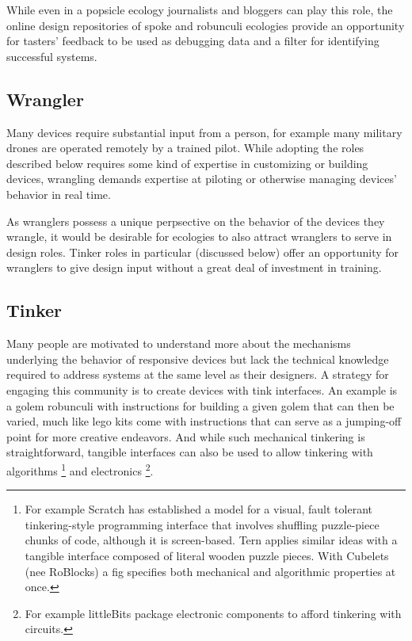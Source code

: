 While even in a popsicle ecology journalists and bloggers can play this role, the online design repositories of spoke and robunculi ecologies provide an opportunity for tasters' feedback to be used as debugging data and a filter for identifying successful systems. 

\subsection{Wrangler}
Many devices require substantial input from a person, for example many military drones are operated remotely by a trained pilot. While adopting the roles described below requires some kind of expertise in customizing or building devices, wrangling demands expertise at piloting or otherwise managing devices' behavior in real time.

As wranglers possess a unique perpsective on the behavior of the devices they wrangle, it would be desirable for ecologies to also attract wranglers to serve in design roles. Tinker roles in particular (discussed below) offer an opportunity for wranglers to give design input without a great deal of investment in training.

\subsection{Tinker}
Many people are motivated to understand more about the mechanisms underlying the behavior of responsive devices but lack the technical knowledge required to address systems at the same level as their designers. 
A strategy for engaging this community is to create devices with tink interfaces. 
An example is a golem robunculi with instructions for building a given golem that can then be varied, much like lego kits come with instructions that can serve as a jumping{}-off point for more creative endeavors. 
And while such mechanical tinkering is straightforward, tangible interfaces can also be used to allow tinkering with algorithms%
\footnote{For example Scratch \citep{scratch} has established a model for a visual, fault tolerant tinkering{}-style programming interface that involves shuffling puzzle{}-piece chunks of code, although it is screen{}-based. 
Tern \citep{tern_classroom} applies similar ideas with a tangible interface composed of literal wooden puzzle pieces. 
With Cubelets (nee RoBlocks) \citep{roblocks} a fig specifies both mechanical and algorithmic properties at once.} 
and electronics%
\footnote{For example littleBits \citep{littlebits} package electronic components to afford tinkering with circuits.}.

